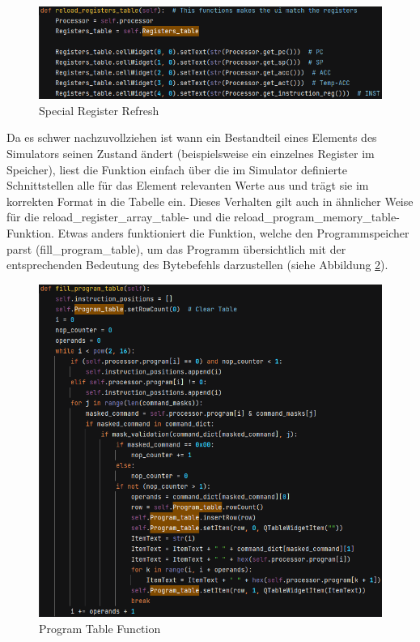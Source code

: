 \documentclass[12pt]{article}
\newcommand{\imgSpaceBefore}{\vspace{10pt}}
\begin{document}
\begin{figure}[H]
\centering
\includegraphics[width=14cm]{bilder/reloadRegs}
\caption{Special Register Refresh}
\label{fig:reloadRegs}
\end{figure}

\noindent
Da es schwer nachzuvollziehen ist wann ein Bestandteil eines Elements des Simulators seinen Zustand ändert (beispielsweise ein einzelnes Register im Speicher), liest die Funktion einfach über die im Simulator definierte Schnittstellen alle für das Element relevanten Werte aus und trägt sie im korrekten Format in die Tabelle ein. Dieses Verhalten gilt auch in ähnlicher Weise für die \glqq reload\_register\_array\_table\grqq- und die \glqq reload\_program\_memory\_table\grqq-Funktion. Etwas anders funktioniert die Funktion, welche den Programmspeicher parst (\glqq fill\_program\_table\grqq), um das Programm übersichtlich mit der entsprechenden Bedeutung des Bytebefehls darzustellen (siehe Abbildung \ref{fig:FillProgReg}).\imgSpaceBefore

\begin{figure}[H]
\centering
\includegraphics[width=14cm]{bilder/FillProgTable}
\caption{Program Table Function}
\label{fig:FillProgReg}
\end{figure}
\end{document}
